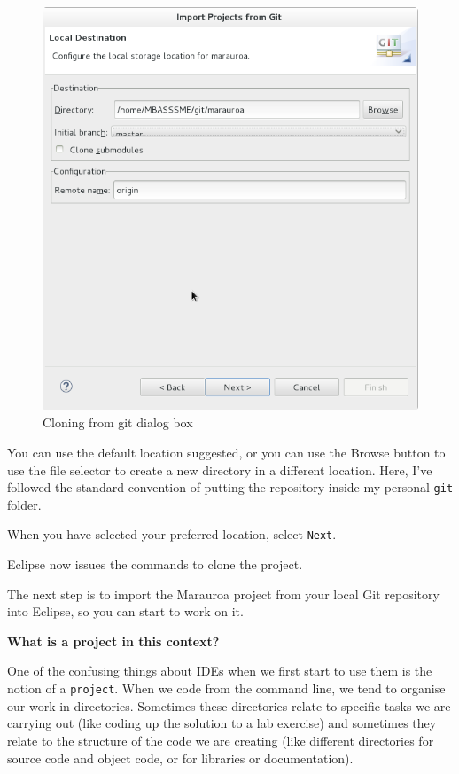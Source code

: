 \documentclass[
]{book}
\begin{document}
\begin{figure}

{\centering \includegraphics[width=1\linewidth]{images/1.4configureLocalStorageMarauroa} 

}

\caption{Cloning from git dialog box}\label{fig:configureLocalStorageMarauroa-fig}
\end{figure}

You can use the default location suggested, or you can use the Browse button to use the file selector to create a new directory in a different location. Here, I've followed the standard convention of putting the repository inside my personal \texttt{git} folder.

When you have selected your preferred location, select \texttt{Next}.

Eclipse now issues the commands to clone the project.

The next step is to import the Marauroa project from your local Git repository into Eclipse, so you can start to work on it.

\textbf{What is a project in this context?}

One of the confusing things about IDEs when we first start to use them is the notion of a \texttt{project}. When we code from the command line, we tend to organise our work in directories. Sometimes these directories relate to specific tasks we are carrying out (like coding up the solution to a lab exercise) and sometimes they relate to the structure of the code we are creating (like different directories for source code and object code, or for libraries or documentation).
\end{document}
